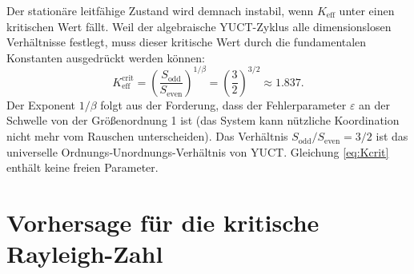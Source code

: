\documentclass[12pt,a4paper]{article}
\begin{document}
	Der stationäre leitfähige Zustand wird demnach instabil, wenn \(K_{\mathrm{eff}}\) unter einen kritischen Wert fällt. Weil der algebraische YUCT-Zyklus alle dimensionslosen Verhältnisse festlegt, muss dieser kritische Wert durch die fundamentalen Konstanten ausgedrückt werden können:
	\begin{equation}\label{eq:Kcrit}
		K_{\mathrm{eff}}^{\mathrm{crit}} = \left( \frac{S_{\mathrm{odd}}}{S_{\mathrm{even}}} \right)^{1/\beta}
		= \left( \frac{3}{2} \right)^{3/2} \approx 1.837.
	\end{equation}
	Der Exponent \(1/\beta\) folgt aus der Forderung, dass der Fehlerparameter \(\varepsilon\) an der Schwelle von der Größenordnung 1 ist (das System kann nützliche Koordination nicht mehr vom Rauschen unterscheiden). Das Verhältnis \(S_{\mathrm{odd}}/S_{\mathrm{even}} = 3/2\) ist das universelle Ordnungs‑Unordnungs-Verhältnis von YUCT. Gleichung \eqref{eq:Kcrit} enthält keine freien Parameter.
	
	\section{Vorhersage für die kritische Rayleigh-Zahl}
	
\end{document}
